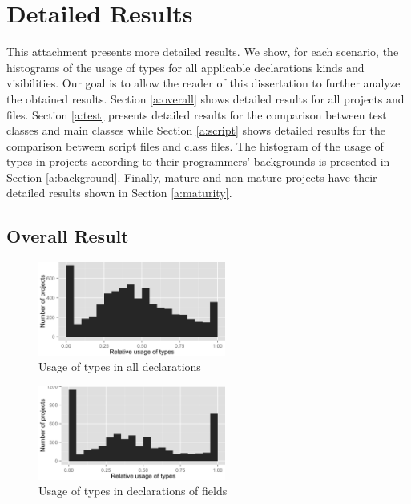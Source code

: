 \chapter{Detailed Results\label{detailed_results}}
This attachment presents more detailed results.
We show, for each scenario, the histograms of the usage of types for all applicable declarations kinds and visibilities.
Our goal is to allow the reader of this dissertation to further analyze the obtained results.
Section \ref{a:overall} shows detailed results for all projects and files.
Section \ref{a:test} presents detailed results for the comparison between test classes and main classes while Section \ref{a:script} shows detailed results for the comparison between script files and class files.
The histogram of the usage of types in projects according to their programmers' backgrounds is presented in Section \ref{a:background}.
Finally, mature and non mature projects have their detailed results shown in Section \ref{a:maturity}.

\section{Overall Result\label{a:overall}}

\begin{figure}[h]
\centering 
\includegraphics[width=0.55\textwidth]{../aosd_2014/analysis/result/all/histograms/5_all_types.png} 
\caption{Usage of types in all declarations}
\end{figure}

\begin{figure}[h]
\centering 
\includegraphics[width=0.55\textwidth]{../aosd_2014/analysis/result/all/histograms/10_Field.png} 
\caption{Usage of types in declarations of fields}
\end{figure}


